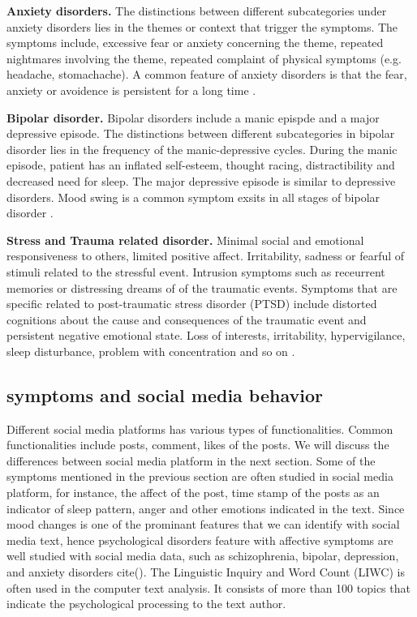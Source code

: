 \textbf{Anxiety disorders.} The distinctions between different subcategories under anxiety disorders lies in the themes or context that trigger the symptoms. The symptoms include,  excessive fear or anxiety concerning the theme, repeated nightmares involving the theme, repeated complaint of physical symptoms (e.g. headache, stomachache). A common feature of anxiety disorders is that the fear, anxiety or avoidence is persistent for a long time \cite{american2013diagnostic}.


\textbf{Bipolar disorder.} Bipolar disorders include a manic epispde and a major depressive episode. The distinctions between different subcategories in bipolar disorder lies in the frequency of the manic-depressive cycles. During the manic episode, patient has an inflated self-esteem, thought racing, distractibility and decreased need for sleep. The major depressive episode is similar to depressive disorders. Mood swing is a common symptom exsits in all stages of bipolar disorder \cite{american2013diagnostic}.

\textbf{Stress and Trauma related disorder.} Minimal social and emotional responsiveness to others, limited positive affect. Irritability, sadness or fearful of stimuli related to the stressful event. Intrusion symptoms such as receurrent memories or distressing dreams of of the traumatic events. Symptoms that are specific related to post-traumatic stress disorder (PTSD) include distorted cognitions about the cause and consequences of the traumatic event and persistent negative emotional state. Loss of interests, irritability, hypervigilance, sleep disturbance, problem with concentration and so on \cite{american2013diagnostic}.

\subsection{symptoms and social media behavior}

Different social media platforms has various types of functionalities. Common functionalities include posts, comment, likes of the posts. We will discuss the differences between social media platform in the next section. Some of the symptoms mentioned in the previous section are often studied in social media platform, for instance, the affect of the post, time stamp of the posts as an indicator of sleep pattern, anger and other emotions indicated in the text. Since mood changes is one of the prominant features that we can identify with social media text, hence psychological disorders feature with affective symptoms are well studied with social media data, such as schizophrenia, bipolar, depression, and anxiety disorders cite(). The Linguistic Inquiry and Word Count (LIWC) is often used in the computer text analysis. It consists of more than 100 topics that indicate the psychological processing to the text author. 
 

